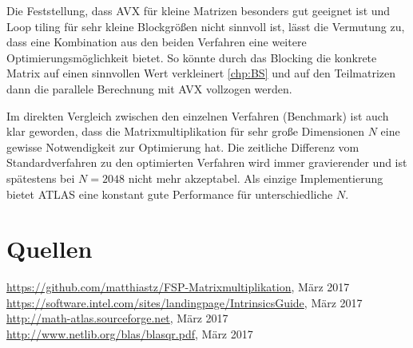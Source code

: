 \documentclass[a4paper,11pt]{scrartcl}
\begin{document}
Die Feststellung, dass AVX für kleine Matrizen besonders gut geeignet ist und 
Loop tiling für sehr kleine Blockgrößen nicht sinnvoll ist, lässt die Vermutung zu,
dass eine Kombination aus den beiden Verfahren eine weitere Optimierungsmöglichkeit 
bietet. So könnte durch das Blocking die konkrete Matrix auf einen sinnvollen Wert verkleinert
 \ref{chp:BS} und auf den Teilmatrizen dann die parallele Berechnung mit AVX vollzogen werden.
\newline
 
Im direkten Vergleich zwischen den einzelnen Verfahren (Benchmark) ist auch klar geworden, dass die 
Matrixmultiplikation für sehr große Dimensionen $N$ eine gewisse Notwendigkeit zur Optimierung
hat. Die zeitliche Differenz vom Standardverfahren zu den optimierten Verfahren wird immer
gravierender und ist spätestens bei $N=2048$ nicht mehr akzeptabel. Als einzige Implementierung
bietet ATLAS eine konstant gute Performance für unterschiedliche $N$.


\section{Quellen}
\begin{thebibliography}{9}

 \url{https://github.com/matthiastz/FSP-Matrixmultiplikation}, März 2017
 \url{https://software.intel.com/sites/landingpage/IntrinsicsGuide}, März 2017
 \url{http://math-atlas.sourceforge.net}, März 2017
 \url{http://www.netlib.org/blas/blasqr.pdf}, März 2017

\end{thebibliography}
\end{document}
